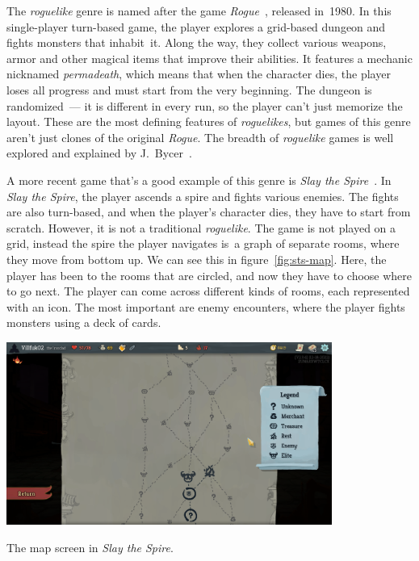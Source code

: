 The \emph{roguelike} genre is named after the game \emph{Rogue}~\cite{RogueWiki}, released in~1980.
In this single-player turn-based game, the player explores a grid-based dungeon and fights monsters that inhabit~it.
Along the way, they collect various weapons, armor and other magical items that improve their abilities.
It features a mechanic nicknamed \emph{permadeath}, which means that when the character dies, the player loses all progress and must start from the very beginning.
The dungeon is randomized~--- it is different in every run, so the player can't just memorize the layout.
These are the most defining features of \emph{roguelikes}, but games of this genre aren't just clones of the original \emph{Rogue}.
The breadth of \emph{roguelike} games is well explored and explained by J.~Bycer~\cite{roguelikeBycer}.

A more recent game that's a good example of this genre is \emph{Slay the Spire}~\cite{StS}.
In \emph{Slay the Spire}, the player ascends a spire and fights various enemies.
The fights are also turn-based, and when the player's character dies, they have to start from scratch.
However, it is not a traditional \emph{roguelike}.
The game is not played on a grid, instead the spire the player navigates is~a graph of separate rooms, where they move from bottom up.
We can see this in figure~\ref{fig:sts-map}.
Here, the player has been to the rooms that are circled, and now they have to choose where to go next.
The player can come across different kinds of rooms, each represented with an icon.
The most important are enemy encounters, where the player fights monsters using a deck of cards.

\begin{center}
    \captionsetup{type=figure}
    \includegraphics[width=0.8\textwidth]{img/Slay-the-Spire-Map.png}
    \caption{The map screen in \emph{Slay the Spire}.}
    \label{fig:sts-map}
\end{center}

